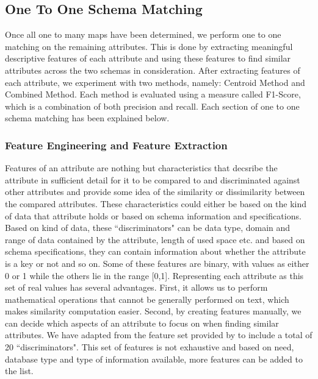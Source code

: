 \documentclass[conference]{IEEEtran}
\begin{document}
\subsection{One To One Schema Matching}
Once all one to many maps have been determined, we perform one to one matching on the remaining attributes. This is done by extracting meaningful descriptive features of each attribute and using these features to find similar attributes across the two schemas in consideration. After extracting features of each attribute, we experiment with two methods, namely: Centroid Method and Combined Method. Each method is evaluated using a measure called F1-Score, which is a combination of both precision and recall. Each section of one to one schema matching has been explained below.

\subsubsection*{\textbf{Feature Engineering and Feature Extraction}}

Features of an attribute are nothing but characteristics that decsribe the attribute in sufficient detail for it to be compared to and discriminated against other attributes and provide some idea of the similarity or dissimilarity between the compared attributes. These characteristics could either be based on the kind of data that attribute holds or based on schema information and specifications. Based on kind of data, these ``discriminators" can be data type, domain and range of data contained by the attribute, length of used space etc. and based on schema specifications, they can contain information about whether the attribute is a key or not and so on. Some of these features are binary, with values as either 0 or 1 while the others lie in the range [0,1]. Representing each attribute as this set of real values has several advantages. First, it allows us to perform mathematical operations that cannot be generally performed on text, which makes similarity computation easier. Second, by creating features manually, we can decide which aspects of an attribute to focus on when finding similar attributes. We have adapted from the feature set provided by \cite{ref1} to include a total of 20 ``discriminators". This set of features is not exhaustive and based on need, database type and type of information available, more features can be added to the list.
\end{document}
